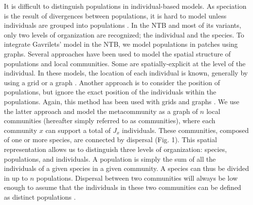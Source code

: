 \documentclass[letterpaper,twocolumn,superscriptaddress,showkeys]{revtex4}
\begin{document}
It is difficult to distinguish populations in individual-based models. As speciation is the result of divergences between populations, it is hard to model unless individuals are grouped into populations \cite{coy04}. In the NTB and most of its variants, only two levels of organization are recognized; the individual and the species. To integrate Gavrilets' model in the NTB, we model populations in patches using graphs. Several approaches have been used to model the spatial structure of populations and local communities. Some are spatially-explicit at the level of the individual. In these models, the location of each individual is known, generally by using a grid \cite{ros07} or a graph \cite{lie05}. Another approach is to consider the position of populations, but ignore the exact position of the individuals within the populations. Again, this method has been used with grids \cite{gav05} and graphs \cite{min07,eco08,dal10}. We use the latter approach and model the metacommunity as a graph of $n$ local communities (hereafter simply referred to as communities), where each community $x$ can support a total of $J_x$ individuals. These communities, composed of one or more species, are connected by dispersal \cite{eco08,eco10} (Fig. 1). This spatial representation allows us to distinguish three levels of organization: species, populations, and individuals. A population is simply the sum of all the individuals of a given species in a given community. A species can thus be divided in up to $n$ populations. Dispersal between two communities will always be low enough to assume that the individuals in these two communities can be defined as distinct populations \cite{ber02}.
\end{document}
